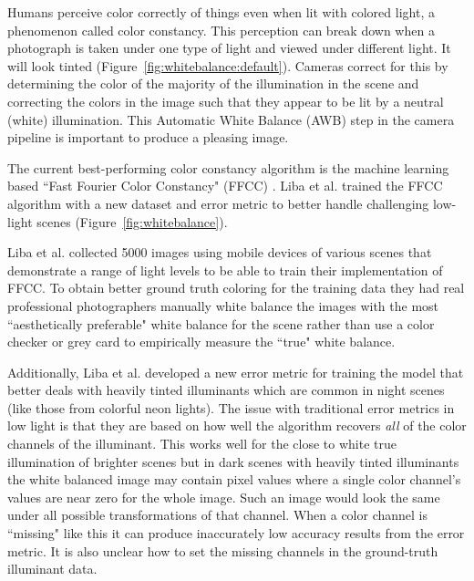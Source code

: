 \documentclass{sig-alternate}
\begin{document}
Humans perceive color correctly of things even when lit with colored light, a phenomenon called color constancy. This perception can break down when a photograph is taken under one type of light and viewed under different light. It will look tinted (Figure~\ref{fig:whitebalance:default}).
Cameras correct for this by determining the color of the majority of the illumination in the scene and correcting the colors in the image such that they appear to be lit by a neutral (white) illumination. 
This Automatic White Balance (AWB) step in the camera pipeline is important to produce a pleasing image. \cite{Liba2019, blog:Levoy2018}

The current best-performing color constancy algorithm is the machine learning based ``Fast Fourier Color Constancy" (FFCC) \cite{Barron2017}.
Liba et al. trained the FFCC algorithm with a new dataset and error metric to better handle challenging low-light scenes (Figure~\ref{fig:whitebalance}).

Liba et al. collected 5000 images using mobile devices of various scenes that demonstrate a range of light levels to be able to train their implementation of FFCC. To obtain better ground truth coloring for the training data they had real professional photographers manually white balance the images with the most ``aesthetically preferable" white balance for the scene rather than use a color checker or grey card to empirically measure the ``true" white balance.~\cite{Liba2019}

Additionally, Liba et al. developed a new error metric for training the model that better deals with heavily tinted illuminants which are common in night scenes (like those from colorful neon lights). The issue with traditional error metrics in low light is that they are based on how well the algorithm recovers \emph{all} of the color channels of the illuminant. This works well for the close to white true illumination of brighter scenes but in dark scenes with heavily tinted illuminants the white balanced image may contain pixel values where a single color channel's values are near zero for the whole image. Such an image would look the same under all possible transformations of that channel. 
\pagebreak 
When a color channel is ``missing" like this it can produce inaccurately low accuracy results from the error metric. It is also unclear how to set the missing channels in the ground-truth illuminant data.~\cite{Liba2019}
\end{document}
